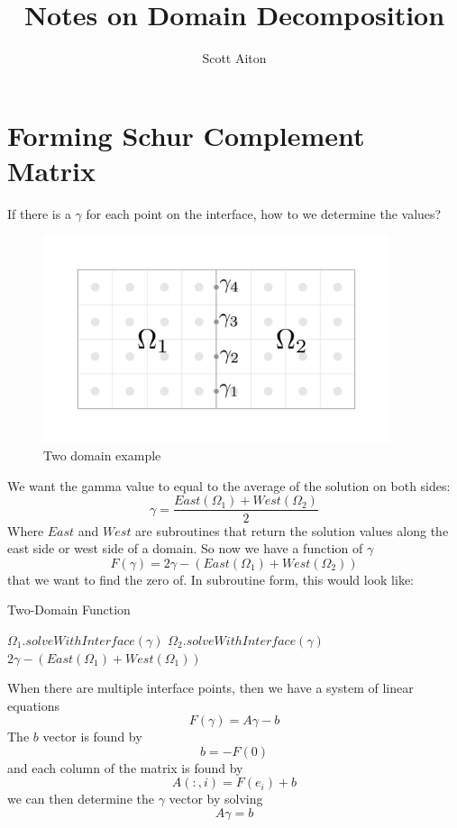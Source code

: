 \documentclass[12pt]{article}
\begin{document}
\title{Notes on Domain Decomposition}
\author{Scott Aiton}
\maketitle

\section{Forming Schur Complement Matrix}

If there is a $\gamma$ for each point on the interface, how to we determine the values?
\begin{figure}[H]
    \centering
    \includegraphics[width=4in]{images/abdomain.pdf}
    \caption{Two domain example}
\end{figure}
We want the gamma value to equal to the average of the solution on both sides:
\begin{equation}
    \gamma = \frac{East(\Omega_1)+West(\Omega_2)}{2}
\end{equation}
Where $East$ and $West$ are subroutines that return the solution values along the east side or west side
of a domain.
So now we have a function of $\gamma$
\begin{equation}
    F(\gamma)=2\gamma-(East(\Omega_1)+West(\Omega_2))
    \label{function}
\end{equation}
that we want to find the zero of. In subroutine form, this would look like:
\begin{algorithm}[H]
\caption{Two-Domain Function}
\begin{algorithmic}[1]
    \State $\Omega_1.solveWithInterface(\gamma)$
    \State $\Omega_2.solveWithInterface(\gamma)$
    \State \Return $2\gamma-(East(\Omega_1)+West(\Omega_1))$
    \EndProcedure
\end{algorithmic}
\end{algorithm}

When there are multiple interface points, then we have a system of linear equations
\begin{equation}
F(\gamma)=A\gamma-b
\end{equation}
The $b$ vector is found by
\begin{equation}
b=-F(0)
    \label{bvec}
\end{equation}
and each column of the matrix is found by
\begin{equation}
A(:,i) = F(e_i)+b
    \label{matrixcol}
\end{equation}
we can then determine the  $\gamma$ vector by solving
\begin{equation}
A\gamma=b
\end{equation}
\end{document}
